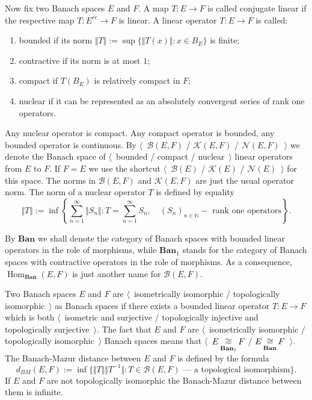 Now fix two Banach spaces $E$ and $F$. A map $T:E\to F$ is called conjugate
linear if the respective map $T:E^{cc}\to F$ is linear. A linear operator
$T:E\to F$ is called:
\begin{enumerate}[label = (\roman*)]
  \item bounded if its norm $\Vert T\Vert:=\sup \{\Vert T(x)\Vert:x\in B_E \}$ 
  is finite;

  \item contractive if its norm is at most $1$;

  \item compact if $T(B_E)$ is relatively compact in $F$;

  \item nuclear if it can be represented as an absolutely convergent series of
  rank one operators.
\end{enumerate}

Any nuclear operator is compact. Any compact operator is
bounded, any bounded operator is continuous. By $\langle$~$\mathcal{B}(E,F)$ /
$\mathcal{K}(E,F)$ / $\mathcal{N}(E,F)$~$\rangle$ we denote the Banach space of
$\langle$~bounded / compact / nuclear~$\rangle$ linear operators from $E$ to
$F$. If $F=E$ we use the shortcut $\langle$~$\mathcal{B}(E)$ / $\mathcal{K}(E)$
/ $\mathcal{N}(E)$~$\rangle$ for this space. The norms in $\mathcal{B}(E,F)$ and
$\mathcal{K}(E,F)$ are just the usual operator norm. The norm of a nuclear
operator $T$ is defined by equality
$$
\Vert T\Vert
:=\inf\left \{
  \sum_{n=1}^\infty\Vert S_n\Vert
  :T=\sum_{n=1}^\infty S_n,\quad 
  {(S_n)}_{n\in\mathbb{N}} - \mbox{ rank one operators}
\right \}.
$$

By $\mathbf{Ban}$ we shall denote the category of Banach spaces with bounded
linear operators in the role of morphisms, while $\mathbf{Ban}_1$ stands for the
category of Banach spaces with contractive operators in the role of morphisms.
As a consequence, $\operatorname{Hom}_{\mathbf{Ban}}(E,F)$ is just another
name for $\mathcal{B}(E,F)$.

Two Banach spaces $E$ and $F$ are $\langle$~isometrically isomorphic /
topologically isomorphic~$\rangle$ as Banach spaces if there exists a bounded
linear operator $T:E\to F$ which is both $\langle$~isometric and surjective /
topologically injective and topologically surjective~$\rangle$. The fact that
$E$ and $F$ are $\langle$~isometrically isomorphic / topologically
isomorphic~$\rangle$ Banach spaces means that
$\langle$~$E\mathop{\mathbin{\cong}}\limits_{\mathbf{Ban}_1}F$ / $E\mathop{\mathbin{\cong}}\limits_{\mathbf{Ban}}F$~$\rangle$. The
Banach-Mazur distance between $E$ and $F$ is defined by the formula 
$$
d_{BM}(E,F):=\inf \{
  \Vert T\Vert\Vert T^{-1}\Vert
  :T \in \mathcal{B}(E,F) \mbox{ --- a topological isomorphism}
 \}.
$$ 
If $E$ and $F$ are not topologically isomorphic the Banach-Mazur distance
between them is infinite.



